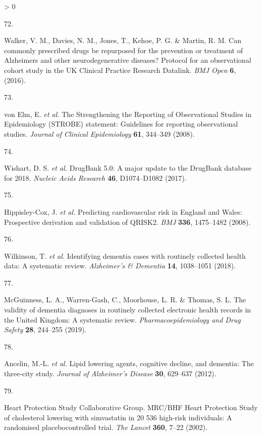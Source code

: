 \documentclass[a4paper, twoside]{templates/ociamthesis}
\newlength{\cslhangindent}
\newlength{\csllabelwidth}
\newenvironment{CSLReferences}[3] %
 {%
  \setlength{\parindent}{0pt}
  \ifodd #1 \everypar{\setlength{\hangindent}{\cslhangindent}}\ignorespaces\fi
  \ifnum #2 > 0
  \setlength{\parskip}{#2\baselineskip}
  \fi
 }%
 {}
\newcommand{\CSLLeftMargin}[1]{\parbox[t]{\maxof{\widthof{#1}}{\csllabelwidth}}{#1}}
\newcommand{\CSLRightInline}[1]{\parbox[t]{\linewidth - \csllabelwidth}{#1}}
\begin{document}
\begin{CSLReferences}{0}{0}
\leavevmode\hypertarget{ref-walker2016a}{}%
\CSLLeftMargin{72. }
\CSLRightInline{Walker, V. M., Davies, N. M., Jones, T., Kehoe, P. G. \& Martin, R. M. Can commonly prescribed drugs be repurposed for the prevention or treatment of {Alzheimers} and other neurodegenerative diseases? {Protocol} for an observational cohort study in the {UK Clinical Practice Research Datalink}. \emph{BMJ Open} \textbf{6}, (2016).}

\leavevmode\hypertarget{ref-vonelm2008}{}%
\CSLLeftMargin{73. }
\CSLRightInline{von Elm, E. \emph{et al.} The {Strengthening} the {Reporting} of {Observational Studies} in {Epidemiology} ({STROBE}) statement: Guidelines for reporting observational studies. \emph{Journal of Clinical Epidemiology} \textbf{61}, 344--349 (2008).}

\leavevmode\hypertarget{ref-wishart2017}{}%
\CSLLeftMargin{74. }
\CSLRightInline{Wishart, D. S. \emph{et al.} {DrugBank} 5.0: A major update to the {DrugBank} database for 2018. \emph{Nucleic Acids Research} \textbf{46}, D1074--D1082 (2017).}

\leavevmode\hypertarget{ref-hippisley-cox2008}{}%
\CSLLeftMargin{75. }
\CSLRightInline{Hippisley-Cox, J. \emph{et al.} Predicting cardiovascular risk in {England} and {Wales}: Prospective derivation and validation of {QRISK2}. \emph{BMJ} \textbf{336}, 1475--1482 (2008).}

\leavevmode\hypertarget{ref-wilkinson2018a}{}%
\CSLLeftMargin{76. }
\CSLRightInline{Wilkinson, T. \emph{et al.} Identifying dementia cases with routinely collected health data: {A} systematic review. \emph{Alzheimer's \& Dementia} \textbf{14}, 1038--1051 (2018).}

\leavevmode\hypertarget{ref-mcguinness2019c}{}%
\CSLLeftMargin{77. }
\CSLRightInline{McGuinness, L. A., Warren-Gash, C., Moorhouse, L. R. \& Thomas, S. L. The validity of dementia diagnoses in routinely collected electronic health records in the {United Kingdom}: {A} systematic review. \emph{Pharmacoepidemiology and Drug Safety} \textbf{28}, 244--255 (2019).}

\leavevmode\hypertarget{ref-ancelin2012}{}%
\CSLLeftMargin{78. }
\CSLRightInline{Ancelin, M.-L. \emph{et al.} Lipid lowering agents, cognitive decline, and dementia: The three-city study. \emph{Journal of Alzheimer's Disease} \textbf{30}, 629--637 (2012).}

\leavevmode\hypertarget{ref-heartprotectionstudycollaborativegroup2002}{}%
\CSLLeftMargin{79. }
\CSLRightInline{Heart Protection Study Collaborative Group. {MRC}/{BHF Heart Protection Study} of cholesterol lowering with simvastatin in 20 536 high-risk individuals: A randomised placebocontrolled trial. \emph{The Lancet} \textbf{360}, 7--22 (2002).}


\end{CSLReferences}
\end{document}
